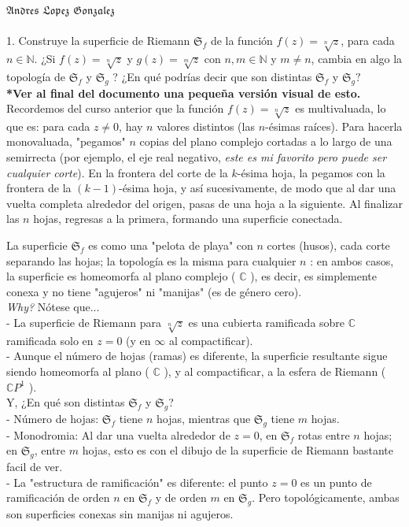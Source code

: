 \documentclass{article}
\theoremstyle{nonumberplain}
\begin{document}
\hspace{12cm}$\mathfrak{Andres \,\, Lopez \,\, Gonzalez}$\\\\
1. Construye la superficie de Riemann \( \mathfrak{S}_{f} \) de la función \( f(z)=\sqrt[n]{z} \), para cada \( n \in \mathbb{N} \). ¿Si \( f(z)=\sqrt[n]{z} \) y \( g(z)=\sqrt[m]{z} \) con \( n, m \in \mathbb{N} \) y \( m \neq n \), cambia en algo la topología de \( \mathfrak{S}_{f} \) y \( \mathfrak{S}_{g} \) ? ¿En qué podrías decir que son distintas \( \mathfrak{S}_{f} \) y \( \mathfrak{S}_{g} ? \) \\

\textbf{*Ver al final del documento una pequeña versión visual de esto.} Recordemos del curso anterior que la función \( f(z) = \sqrt[n]{z} \) es multivaluada, lo que es: para cada \( z \neq 0 \), hay \( n \) valores distintos (las \( n \)-ésimas raíces).
Para hacerla monovaluada, "pegamos" \( n \) copias del plano complejo cortadas a lo largo de una semirrecta (por ejemplo, el eje real negativo, \textit{este es mi favorito pero puede ser cualquier corte}).
En la frontera del corte de la \( k \)-ésima hoja, la pegamos con la frontera de la \( (k-1) \)-ésima hoja, y así sucesivamente, de modo que al dar una vuelta completa alrededor del origen, pasas de una hoja a la siguiente.
Al finalizar las \( n \) hojas, regresas a la primera, formando una superficie conectada.

La superficie \( \mathfrak{S}_f \) es como una "pelota de playa" con \( n \) cortes (husos), cada corte separando las hojas; la topología es la misma para cualquier \( n \) : en ambos casos, la superficie es homeomorfa al plano complejo ( \( \mathbb{C} \) ), es decir, es simplemente conexa y no tiene "agujeros" ni "manijas" (es de género cero).\\
\textit{Why?} Nótese que... \\
- La superficie de Riemann para \( \sqrt[n]{z} \) es una cubierta ramificada sobre \( \mathbb{C} \) ramificada solo en \( z=0 \) (y en \( \infty \) al compactificar). \\
- Aunque el número de hojas (ramas) es diferente, la superficie resultante sigue siendo homeomorfa al plano ( \( \mathbb{C} \) ), y al compactificar, a la esfera de Riemann ( \( \mathbb{C} P^{1} \) ). \\

Y, ¿En qué son distintas \( \mathfrak{S}_{f} \) y \( \mathfrak{S}_{g} \)? \\
- Número de hojas: \( \mathfrak{S}_{f} \) tiene \( n \) hojas, mientras que \( \mathfrak{S}_{g} \) tiene \( m \) hojas. \\
- Monodromia: Al dar una vuelta alrededor de \( z=0 \), en \( \mathfrak{S}_{f} \) rotas entre \( n \) hojas; en \( \mathfrak{S}_{g} \), entre \( m \) hojas, esto es con el dibujo de la superficie de Riemann bastante facil de ver. \\
- La "estructura de ramificación" es diferente: el punto \( z=0 \) es un punto de ramificación de orden \( n \) en \( \mathfrak{S}_{f} \) y de orden \( m \) en \( \mathfrak{S}_{g} \). Pero topológicamente, ambas son superficies conexas sin manijas ni agujeros. \\
\end{document}
